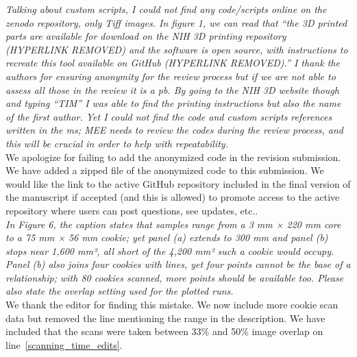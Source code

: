 \documentclass[12pt,a4paper]{article}
\newcommand{\lr}[1]{line~\ref{#1}}
\begin{document}
\emph{Talking about custom scripts, I could not find any code/scripts online on the zenodo repository, only Tiff images. In figure 1, we can read that “the 3D printed parts are available for download on the NIH 3D printing repository (HYPERLINK REMOVED) and the software is open source, with instructions to recreate this tool available on GitHub (HYPERLINK REMOVED).” I thank the authors for ensuring anonymity for the review process but if we are not able to assess all those in the review it is a pb. By going to the NIH 3D website though and typing “TIM” I was able to find the printing instructions but also the name of the first author. Yet I could not find the code and custom scripts references written in the ms; MEE needs to review the codes during the review process, and this will be crucial in order to help with repeatability.} \\

We apologize for failing to add the anonymized code in the revision submission. We have added a zipped file of the anonymized code to this submission. We would like the link to the active GitHub repository included in the final version of the manuscript if accepted (and this is allowed) to promote access to the active repository where users can post questions, see updates, etc.. \\  

\emph{In Figure 6, the caption states that samples range from a 3 mm × 220 mm core to a 75 mm × 56 mm cookie; yet panel (a) extends to 300 mm and panel (b) stops near 1,600 mm², all short of the 4,200 mm² such a cookie would occupy. Panel (b) also joins four cookies with lines, yet four points cannot be the base of a relationship; with 80 cookies scanned, more points should be available too. Please also state the overlap setting used for the plotted runs.} \\ 

We thank the editor for finding this mistake. We now include more cookie scan data but removed the line mentioning the range in the description. We have included that the scans were taken between 33\% and 50\% image overlap on \lr{scanning_time_edits}. \\ 
\end{document}
